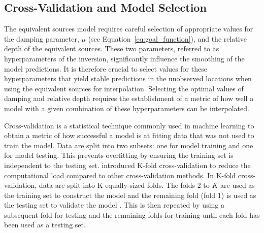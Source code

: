 \subsection{Cross-Validation and Model Selection}

The equivalent sources model requires careful selection of appropriate values for the damping parameter, $\mu$ (see Equation~\ref{eq:goal_function}), and the relative depth of the equivalent sources. These two parameters, referred to as hyperparameters of the inversion, significantly influence the smoothing of the model predictions. It is therefore crucial to select values for these hyperparameters that yield stable predictions in the unobserved locations when using the equivalent sources for interpolation. Selecting the optimal values of damping and relative depth requires the establishment of a metric of how well a model with a given combination of these hyperparameters can be interpolated.

Cross-validation is a statistical technique commonly used in machine learning to obtain a metric of how successful a model is at fitting data that was not used to train the model. Data are split into two subsets: one for model training and one for model testing. This prevents overfitting by ensuring the training set is independent to the testing set. \citet{Geisser1975} introduced K-fold cross-validation to reduce the computational load compared to other cross-validation methods. In K-fold cross-validation, data are split into K equally-sized folds. The folds 2 to $K$ are used as the training set to construct the model and the remaining fold (fold 1) is used as the testing set to validate the model \citep{Jung2017}. This is then repeated by using a subsequent fold for testing and the remaining folds for training until each fold has been used as a testing set.

